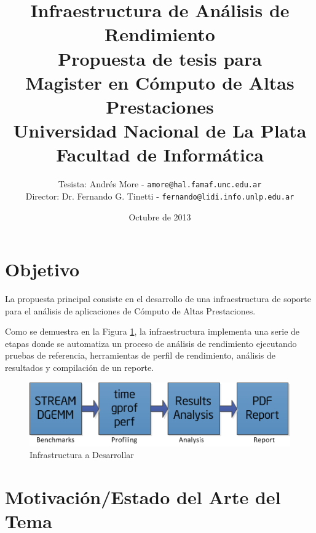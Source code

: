 \documentclass[a4paper]{article}
\begin{document}
\title{Infraestructura de Análisis de Rendimiento\\
\bigskip
{\large Propuesta de tesis para\\} Magister en Cómputo de Altas Prestaciones\\
\bigskip
Universidad Nacional de La Plata\\
Facultad de Informática\\
\bigskip
}

\author{Tesista: Andrés More - {\tt amore@hal.famaf.unc.edu.ar}\\
Director: Dr. Fernando G. Tinetti - {\tt fernando@lidi.info.unlp.edu.ar}}

\date{Octubre de 2013}

\maketitle

\newpage

\section{Objetivo}

La propuesta principal consiste en el desarrollo de una infraestructura de soporte para el análisis de aplicaciones de Cómputo de Altas Prestaciones.

\smallskip

Como se demuestra en la Figura \ref{fig:framework}, la infraestructura implementa una serie de etapas donde se automatiza un proceso de análisis de rendimiento ejecutando pruebas de referencia, herramientas de perfil de rendimiento, análisis de resultados y compilación de un reporte.

\begin{figure}[H]
\centering
\includegraphics{framework.png}
\caption{Infrastructura a Desarrollar}
\label{fig:framework}
\end{figure}

\section{Motivación/Estado del Arte del Tema}
\end{document}

